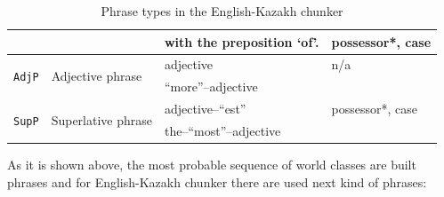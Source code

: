 \documentclass[11pt]{article}
\begin{document}
\begin{savenotes}
\begin{table}
\begin{tabular}{|l|l|l|l|}
                                   &                                   & with the preposition `of'. & possessor*, case \\
    \hline
    \multirow{2}{*}{\texttt{AdjP}} & \multirow{2}{*}{Adjective phrase}  & adjective & n/a \\
                                   &                                    & ``more''--adjective & \\
    \hline
    \multirow{2}{*}{\texttt{SupP}} & \multirow{2}{*}{Superlative phrase} & adjective--``est'' & possessor*, case \\
                                   &                                     & the--``most''--adjective & \\ 
    \hline
  \end{tabular}
  \caption{Phrase types in the English-Kazakh chunker}
  \label{table:phrases} 
\end{table}
\end{savenotes}
As it is shown above, the most probable sequence of world classes are built phrases and 
for English-Kazakh chunker there are used next kind of phrases:


\end{document}
